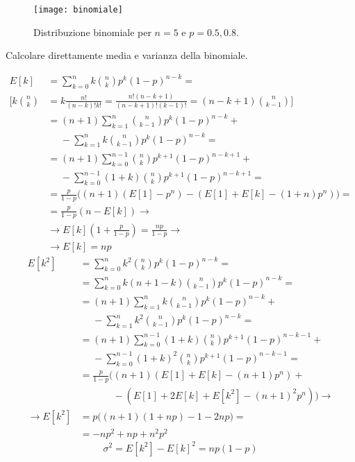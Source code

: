 
\begin{figure}
	\centering
	\texttt{[image: binomiale]}
	\caption{Distribuzione binomiale per $n=5$ e $p=0.5, 0.8$.}
\end{figure}

\begin{exercise}
	Calcolare direttamente media e varianza della binomiale.
\end{exercise}

\begin{solution}
	\begin{align*}
		E[k] &=
		\sum_{k=0}^n k \binom nk p^k (1-p)^{n-k} = \\
		\Bigg[ k \binom nk &= k \frac{n!}{(n-k)!k!} = \frac{n!(n-k+1)}{(n-k+1)!(k-1)!} = (n-k+1) \binom n{k-1} \Bigg] \\
		&= (n+1) \sum_{k=1}^n \binom n{k-1} p^k (1-p)^{n-k} + {} \\
		&\phantom{{}={}} - \sum_{k=1}^n k \binom n{k-1} p^k (1-p)^{n-k} = \\
		&= (n+1) \sum_{k=0}^{n-1} \binom nk p^{k+1} (1-p)^{n-k+1} + {} \\
		&\phantom{{}={}} - \sum_{k=0}^{n-1} (1+k) \binom nk p^{k+1} (1-p)^{n-k+1} = \\
		&= \frac p{1-p} \big( (n+1)(E[1] - p^n) - (E[1] + E[k] - (1+n)p^n) \big) = \\
		&= \frac p{1-p} ( n - E[k] ) \rightarrow \\
		&\rightarrow E[k]\left(1+\frac p{1-p} \right) = \frac {np}{1-p} \rightarrow \\
		&\rightarrow E[k] = np
	\end{align*}
	\begin{align*}
		E[k^2] &=
		\sum_{k=0}^n k^2 \binom nk p^k (1-p)^{n-k} = \\
		&= \sum_{k=0}^n k(n+1-k) \binom n{k-1} p^k (1-p)^{n-k} = \\
		&= (n+1) \sum_{k=1}^n k \binom n{k-1} p^k (1-p)^{n-k} + {} \\
		&\phantom{{}={}} - \sum_{k=1}^n k^2 \binom n{k-1} p^k (1-p)^{n-k} = \\
		&= (n+1) \sum_{k=0}^{n-1} (1+k) \binom nk p^{k+1} (1-p)^{n-k-1} + {} \\
		&\phantom{{}={}} - \sum_{k=0}^{n-1} (1+k)^2 \binom nk p^{k+1} (1-p)^{n-k-1} = \\
		&= \frac p{1-p} \Big(
		(n+1)(E[1] + E[k] - (n+1)p^n) + {} \\
		&\phantom{{} = \frac p{1-p} \big({}} - (E[1] + 2E[k] + E[k^2] - (n+1)^2p^n) \Big) \rightarrow \\
		\rightarrow E[k^2] &= p\big((n+1)(1+np) - 1 - 2np\big) = \\
		&= -np^2 + np + n^2p^2
	\end{align*}
	\begin{equation*}
		\sigma^2 = E[k^2] - E[k]^2 = np(1-p)
	\end{equation*}
\end{solution}

